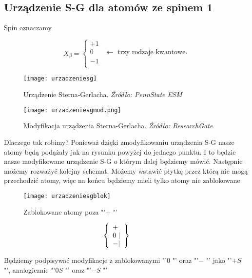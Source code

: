 \subsection{Urządzenie S-G dla atomów ze spinem 1}
\begin{minipage}{0.2 \textwidth}
	\vspace{11pt}
	Spin oznaczamy
\end{minipage}
\begin{minipage}{0.11 \textwidth}
	\begin{equation*}
		X_{\beta} = 
		\begin{cases}
			+1 \\
			0 \hspace{20pt} \leftarrow \text{ trzy rodzaje kwantowe.} \\
			-1 \\
		\end{cases}
	\end{equation*}
\end{minipage}
\begin{figure}[H]
	\centering
	\texttt{[image: urzadzeniesg]}
	\caption{Urządzenie Sterna-Gerlacha. \textit{Źródło: PennState ESM}}
	\label{fig:urzSG}
\end{figure}
\begin{figure}[H]
	\centering
	\texttt{[image: urzadzeniesgmod.png]}
	\caption{Modyfikacja urządzenia Sterna-Gerlacha. \textit{Źródło: ResearchGate}}
	\label{fig:urzSGmod}
\end{figure}
Dlaczego tak robimy? Ponieważ dzięki zmodyfikowaniu urządzenia S-G nasze atomy będą podążały jak na rysunku powyżej do jednego punktu. I to będzie nasze modyfikowane urządzenie S-G o którym dalej będziemy mówić. Następnie możemy rozważyć kolejny schemat. Możemy wstawić płytkę przez którą nie mogą przechodzić atomy, więc na końcu będziemy mieli tylko atomy nie zablokowane.

\begin{minipage}{0.5 \textwidth}
	\begin{figure}[H]
		\centering
		\texttt{[image: urzadzeniesgblok]}
		\caption{Zablokowane atomy poza  "'$+$ "'}
		\label{fig:urzSGblok}
	\end{figure}
\end{minipage}
\begin{minipage}{0.05 \textwidth}
	\vspace{-20pt}
	\begin{equation*}
		\hspace{-30pt}
		\left\{\begin{array}{lr}
			+ \\
			0 \hspace{3pt} \vert \\
			- \vert
		\end{array}\right\}
	\end{equation*}
\end{minipage}
\begin{minipage}{0.45 \textwidth}
	Będziemy podpisywać modyfikacje z zablokowanymi  "'$0$ "' oraz  "'$-$ "' jako  "'$+S$ "', analogicznie  "'$0S$ "' oraz  "'$-S$ "'
\end{minipage}


